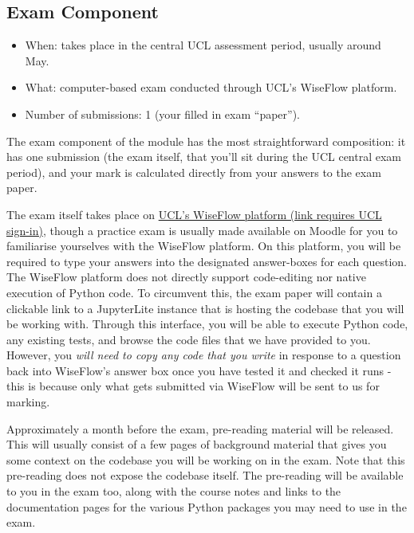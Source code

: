 
\subsection{Exam Component}

\begin{itemize}
  \item When: takes place in the central UCL assessment period, usually around May.
  \item What: computer-based exam conducted through UCL's WiseFlow platform.
  \item Number of submissions: 1 (your filled in exam ``paper'').
\end{itemize}

The exam component of the module has the most straightforward composition: it has one submission (the exam itself, that you'll sit during the UCL central exam period), and your mark is calculated directly from your answers to the exam paper.

The exam itself takes place on \href{https://ucldata.atlassian.net/wiki/spaces/ELearningStudentSupport/pages/63340834/WISEflow+AssessmentUCL+guidance+for+students}{UCL's WiseFlow platform (link requires UCL sign-in)}, though a practice exam is usually made available on Moodle for you to familiarise yourselves with the WiseFlow platform.
On this platform, you will be required to type your answers into the designated answer-boxes for each question.
The WiseFlow platform does not directly support code-editing nor native execution of Python code.
To circumvent this, the exam paper will contain a clickable link to a JupyterLite instance that is hosting the codebase that you will be working with.
Through this interface, you will be able to execute Python code, any existing tests, and browse the code files that we have provided to you.
However, you \emph{will need to copy any code that you write} in response to a question back into WiseFlow's answer box once you have tested it and checked it runs - this is because only what gets submitted via WiseFlow will be sent to us for marking.

Approximately a month before the exam, pre-reading material will be released.
This will usually consist of a few pages of background material that gives you some context on the codebase you will be working on in the exam.
Note that this pre-reading does not expose the codebase itself.
The pre-reading will be available to you in the exam too, along with the course notes and links to the documentation pages for the various Python packages you may need to use in the exam.

